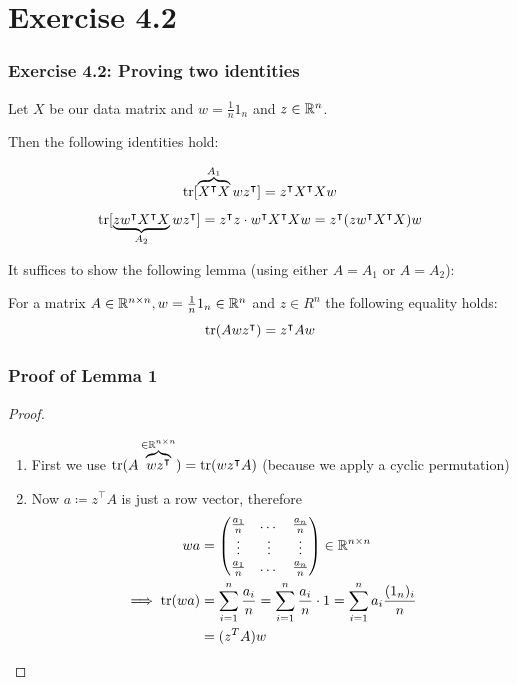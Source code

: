 \documentclass[10pt,aspectratio=169,handout]{beamer}
\begin{document}
\section{Exercise 4.2}

\begin{frame}
    \frametitle{Exercise 4.2: Proving two identities}

    Let $X$ be our data matrix and $w=\frac{1}{n}1_n$ and $z\in \mathbb{R}^n$. 

    Then the following identities hold:

    \begin{equation*}
        \operatorname*{tr}[\overbrace{X^\intercal X}^{A_1} w z^\intercal] = z^\intercal X^\intercal X w
    \end{equation*}
    \begin{equation*}
        \operatorname*{tr}[\underbrace{zw^\intercal X^\intercal X}_{A_2} w z^\intercal] = z^\intercal z \cdot w^\intercal X^\intercal X w=z^\intercal (zw^\intercal X^\intercal X) w
    \end{equation*}  

    It suffices to show the following lemma (using either $A=A_1$ or $A=A_2$):

    \begin{lemma}
        For a matrix $A\in \mathbb{R}^{n\times n},w=\frac{1}{n}1_n\in \mathbb{R}^n$ and $z\in R^n$ the following equality holds:
        \[\operatorname*{tr}(Awz^\intercal)=z^\intercal A w\]
    \end{lemma}

\end{frame}

\begin{frame}
    \frametitle{Proof of Lemma 1}

    \begin{proof}
        \begin{enumerate}
            \item First we use $\operatorname*{tr}(A \overbrace{wz^\intercal}^{\in \mathbb{R}^{n\times n}})=\operatorname*{tr}(wz^\intercal A)$ (because we apply a cyclic permutation)
            \item Now $a\coloneqq z^\intercal A$ is just a row vector, therefore 
            \begin{align*}
                w a &= \begin{pmatrix}
                    \frac{a_1}{n} & \dots & \frac{a_n}{n}\\
                    \vdots &\vdots&\vdots\\
                    \frac{a_1}{n} & \dots & \frac{a_n}{n}
                \end{pmatrix}\in\mathbb{R}^{n\times n}\\
                \implies \operatorname*{tr}(wa)&=\sum_{i=1}^n \frac{a_i}{n} = \sum_{i=1}^n \frac{a_i}{n} \cdot 1 = \sum_{i=1}^{n}a_i \frac{(1_n)_i}{n}\\
                & = (z^T A)w
            \end{align*}
        \end{enumerate}
        
    \end{proof}

\end{frame}
\end{document}
